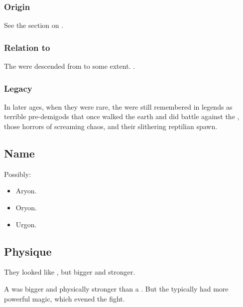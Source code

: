 \subsubsection{Origin}
See the section on . 





\subsubsection{Relation to \resphain}
The \resphain were descended from \aryothim to some extent. 
.





\subsubsection{Legacy}
In later ages, when they were rare, the \aryothim were still remembered in legends as terrible pre-\human demigods that once walked the earth and did battle against the \dragons, those horrors of screaming chaos, and their slithering reptilian spawn. 








\subsection{Name}
Possibly: 

\begin{itemize}
  \item Aryon.
  \item Oryon.
  \item Urgon.
\end{itemize}










\subsection{Physique}
They looked like \nephilim, but bigger and stronger. 

A \aryoth{} was bigger and physically stronger than a \quiljaar. 
But the \quiljaaran{} typically had more powerful magic, which evened the fight. 

